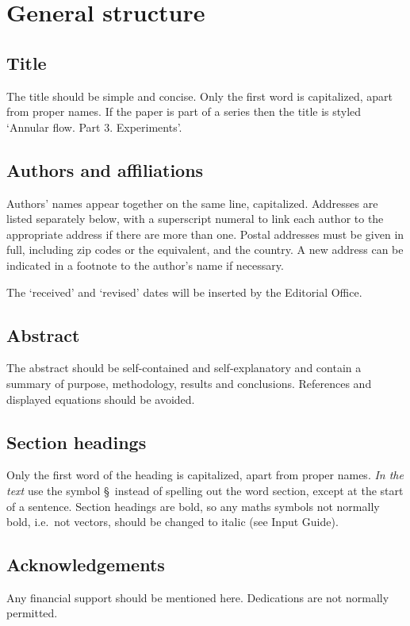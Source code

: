 \section{General structure}

\subsection{Title}
The title should be simple and concise. Only the first word is
capitalized, apart from proper names. If the paper is part of a series 
then the title is styled `Annular flow. Part 3. Experiments'.

\subsection{Authors and affiliations}
Authors' names appear together on the same line, capitalized.
Addresses are listed separately below, with a superscript numeral to
link each author to the appropriate address if there are more than one.
Postal addresses must be given in full, including zip codes or the
equivalent, and the country. A new address can be indicated in a footnote
to the author's name if necessary.

The `received' and `revised' dates will be inserted by the Editorial Office.

\subsection{Abstract}
The abstract should be self-contained and self-explanatory and contain a
summary of purpose, methodology, results and conclusions. References and
displayed equations should be avoided.

\subsection{Section headings}
Only the first word of the heading is capitalized, apart from proper names.
{\em In the text\/} use the symbol \S \, instead of spelling out the word 
section, except at the start of a sentence. Section headings are bold, so any
maths symbols not normally bold, i.e.\ not vectors, should be changed to italic (see Input Guide).

\subsection{Acknowledgements}
Any financial support should be mentioned here. Dedications are not normally
permitted.

